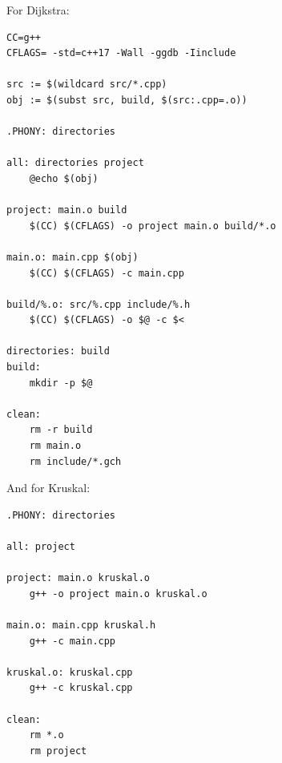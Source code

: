 \documentclass{article}
\begin{document}
\begin{multicols}{2}

For Dijkstra:

\begin{verbatim}
CC=g++
CFLAGS= -std=c++17 -Wall -ggdb -Iinclude

src := $(wildcard src/*.cpp)
obj := $(subst src, build, $(src:.cpp=.o))

.PHONY: directories

all: directories project
	@echo $(obj)

project: main.o build
	$(CC) $(CFLAGS) -o project main.o build/*.o

main.o: main.cpp $(obj)
	$(CC) $(CFLAGS) -c main.cpp

build/%.o: src/%.cpp include/%.h
	$(CC) $(CFLAGS) -o $@ -c $<

directories: build
build:
	mkdir -p $@

clean:
	rm -r build
	rm main.o
	rm include/*.gch
\end{verbatim}

\columnbreak

And for Kruskal:

\begin{verbatim}
.PHONY: directories

all: project

project: main.o kruskal.o
	g++ -o project main.o kruskal.o

main.o: main.cpp kruskal.h
	g++ -c main.cpp

kruskal.o: kruskal.cpp
	g++ -c kruskal.cpp

clean:
	rm *.o
	rm project

\end{verbatim}
\end{multicols}
\end{document}
